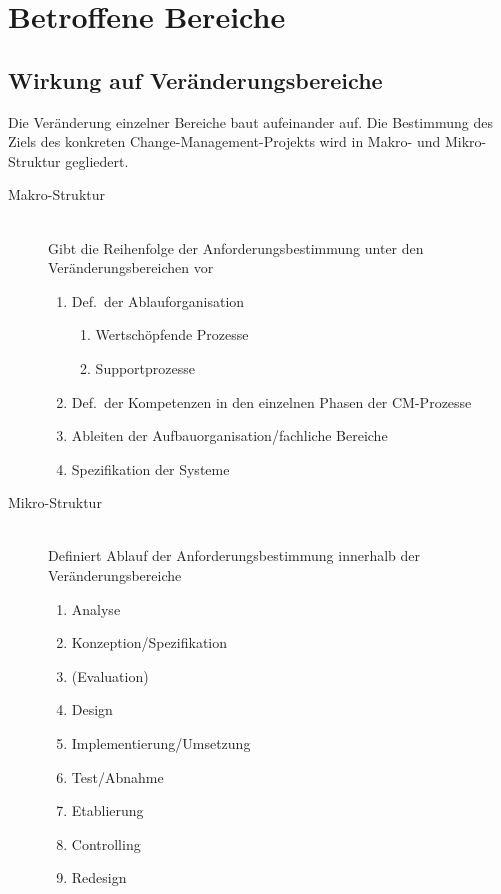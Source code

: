 \documentclass[a4paper, 12pt]{article}
\begin{document}
\section{Betroffene Bereiche}


\subsection{Wirkung auf Veränderungsbereiche}
Die Veränderung einzelner Bereiche baut aufeinander auf. Die Bestimmung des Ziels des konkreten Change-Management-Projekts wird in Makro- und Mikro-Struktur gegliedert.
\begin{description}
  \item[Makro-Struktur]~\\
    Gibt die Reihenfolge der Anforderungsbestimmung unter den Veränderungsbereichen vor
    \begin{enumerate}
      \item Def.\ der Ablauforganisation
        \begin{enumerate}
          \item Wertschöpfende Prozesse
          \item Supportprozesse
        \end{enumerate}
      \item Def.\ der Kompetenzen in den einzelnen Phasen der CM-Prozesse
      \item Ableiten der Aufbauorganisation/fachliche Bereiche
      \item Spezifikation der Systeme
    \end{enumerate}
  \item[Mikro-Struktur]~\\
    Definiert Ablauf der Anforderungsbestimmung innerhalb der Veränderungsbereiche
    \begin{enumerate}
      \item Analyse
      \item Konzeption/Spezifikation
      \item (Evaluation)
      \item Design
      \item Implementierung/Umsetzung
      \item Test/Abnahme
      \item Etablierung
      \item Controlling
      \item Redesign
    \end{enumerate}
\end{description}
\end{document}
